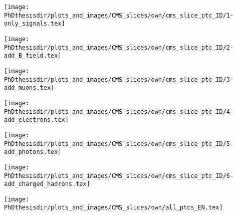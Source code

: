 \begin{frame}
\addtocounter{framenumber}{-1}
\transwipe
{}
\begin{center}
\texttt{[image: \\PhDthesisdir/plots\_and\_images/CMS\_slices/own/cms\_slice\_ptc\_ID/1-only\_signals.tex]}
\end{center}
\end{frame}

\begin{frame}
\addtocounter{framenumber}{-1}
\transdissolve
\begin{center}
\texttt{[image: \\PhDthesisdir/plots\_and\_images/CMS\_slices/own/cms\_slice\_ptc\_ID/2-add\_B\_field.tex]}
\end{center}
\end{frame}

\begin{frame}
\addtocounter{framenumber}{-1}
\transdissolve
\begin{center}
\texttt{[image: \\PhDthesisdir/plots\_and\_images/CMS\_slices/own/cms\_slice\_ptc\_ID/3-add\_muons.tex]}
\end{center}
\end{frame}

\begin{frame}
\addtocounter{framenumber}{-1}
\transdissolve
\begin{center}
\texttt{[image: \\PhDthesisdir/plots\_and\_images/CMS\_slices/own/cms\_slice\_ptc\_ID/4-add\_electrons.tex]}
\end{center}
\end{frame}

\begin{frame}
\addtocounter{framenumber}{-1}
\transdissolve
\begin{center}
\texttt{[image: \\PhDthesisdir/plots\_and\_images/CMS\_slices/own/cms\_slice\_ptc\_ID/5-add\_photons.tex]}
\end{center}
\end{frame}

\begin{frame}
\addtocounter{framenumber}{-1}
\transdissolve
\begin{center}
\texttt{[image: \\PhDthesisdir/plots\_and\_images/CMS\_slices/own/cms\_slice\_ptc\_ID/6-add\_charged\_hadrons.tex]}
\end{center}
\end{frame}

\begin{frame}
\addtocounter{framenumber}{-1}
\transdissolve
\begin{center}
\texttt{[image: \\PhDthesisdir/plots\_and\_images/CMS\_slices/own/all\_ptcs\_EN.tex]}
\end{center}
\end{frame}
